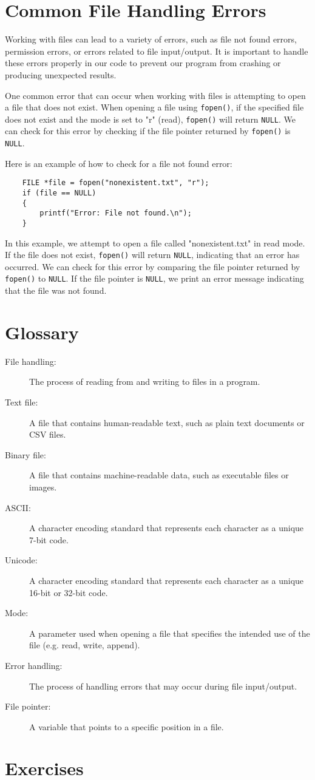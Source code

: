 \section{Common File Handling Errors}

Working with files can lead to a variety of errors, such as file not found errors, permission errors, or errors related to file input/output. It is important to handle these errors properly in our code to prevent our program from crashing or producing unexpected results.

One common error that can occur when working with files is attempting to open a file that does not exist. When opening a file using {\tt fopen()}, if the specified file does not exist and the mode is set to "r" (read), {\tt fopen()} will return {\tt NULL}. We can check for this error by checking if the file pointer returned by {\tt fopen()} is {\tt NULL}.

Here is an example of how to check for a file not found error:

\begin{verbatim}
	FILE *file = fopen("nonexistent.txt", "r");
	if (file == NULL)
	{
		printf("Error: File not found.\n");
	}
\end{verbatim}

In this example, we attempt to open a file called "nonexistent.txt" in read mode. If the file does not exist, {\tt fopen()} will return {\tt NULL}, indicating that an error has occurred. We can check for this error by comparing the file pointer returned by {\tt fopen()} to {\tt NULL}. If the file pointer is {\tt NULL}, we print an error message indicating that the file was not found.

\section{Glossary}

\begin{description}
	\item[File handling:] The process of reading from and writing to files in a program.
	\item[Text file:] A file that contains human-readable text, such as plain text documents or CSV files.
	\item[Binary file:] A file that contains machine-readable data, such as executable files or images.
	\item[ASCII:] A character encoding standard that represents each character as a unique 7-bit code.
	\item[Unicode:] A character encoding standard that represents each character as a unique 16-bit or 32-bit code.
	\item[Mode:] A parameter used when opening a file that specifies the intended use of the file (e.g. read, write, append).
	\item[Error handling:] The process of handling errors that may occur during file input/output.
	\item[File pointer:] A variable that points to a specific position in a file.
\end{description}

\section{Exercises}
\setcounter{exercisenum}{0}




